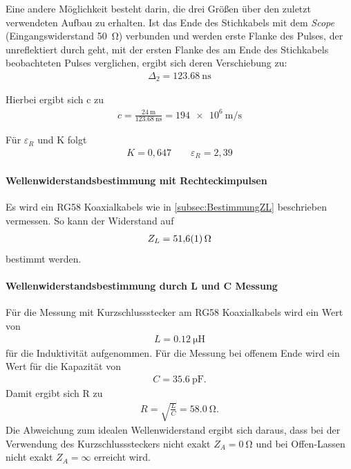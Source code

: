 \documentclass[a4paper,twoside,final]{article}
\begin{document}
Eine andere Möglichkeit besteht darin, die drei Größen über den zuletzt verwendeten Aufbau zu erhalten. Ist das Ende des Stichkabels mit dem \textit{Scope} (Eingangswiderstand \SI{50}{\ohm}) verbunden und werden erste Flanke des Pulses, der unreflektiert durch geht, mit der ersten Flanke des am Ende des Stichkabels beobachteten Pulses verglichen, ergibt sich deren Verschiebung zu:
\begin{align}
\Delta_2  = \SI{123,68}{\nano\second}
\end{align}

Hierbei ergibt sich c zu
\begin{align}
c = \frac{\SI{24}{\metre}}{\SI{123,68}{\nano\second}}= \SI{194e6}{\metre\per\second}
\end{align}

Für $\varepsilon_R$ und K folgt
\begin{align}
K = 0,647 \qquad \varepsilon_R = 2,39
\end{align}

\paragraph{Wellenwiderstandsbestimmung mit Rechteckimpulsen}
Es wird ein RG58 Koaxialkabels wie in \ref{subsec:BestimmungZL} beschrieben vermessen. So kann der Widerstand auf
\begin{align}
Z_L = \SI{51,6 \pm 0,1}{\ohm}
\end{align}
bestimmt werden.

\paragraph{Wellenwiderstandsbestimmung durch L und C Messung}
Für die Messung mit Kurzschlussstecker am RG58 Koaxialkabels wird ein Wert von
\begin{align}
L = \SI{0,12}{\micro\henry}
\end{align}
für die Induktivität aufgenommen. Für die Messung bei offenem Ende wird ein Wert für die Kapazität von
\begin{align}
C = \SI{35,6}{\pico\farad}.
\end{align}
Damit ergibt sich R zu
\begin{align}
R = \sqrt{\frac{L}{C}} =  \SI{58,0}{\ohm}.
\end{align}
Die Abweichung zum idealen Wellenwiderstand ergibt sich daraus, dass bei der Verwendung des Kurzschlusssteckers nicht exakt $Z_A = \SI{0}{\ohm}$ und bei Offen-Lassen nicht exakt $Z_A = \infty$ erreicht wird.
\end{document}
